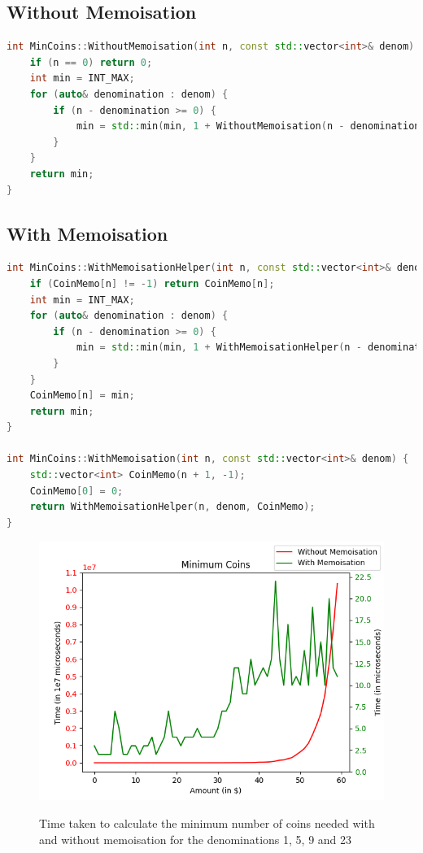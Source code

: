 \documentclass[12pt, a4paper]{article}
\theoremstyle{definition}
\theoremstyle{remark}
\begin{document}
\subsection{Without Memoisation}
\begin{lstlisting}[language=C++]
int MinCoins::WithoutMemoisation(int n, const std::vector<int>& denom) {
    if (n == 0) return 0;
    int min = INT_MAX;
    for (auto& denomination : denom) {
        if (n - denomination >= 0) {
            min = std::min(min, 1 + WithoutMemoisation(n - denomination, denom));
        }
    }
    return min;
}
\end{lstlisting}

\subsection{With Memoisation}

\begin{lstlisting}[language=C++]
int MinCoins::WithMemoisationHelper(int n, const std::vector<int>& denom, std::vector<int>& CoinMemo) {
    if (CoinMemo[n] != -1) return CoinMemo[n];
    int min = INT_MAX;
    for (auto& denomination : denom) {
        if (n - denomination >= 0) {
            min = std::min(min, 1 + WithMemoisationHelper(n - denomination, denom, CoinMemo));
        }
    }
    CoinMemo[n] = min;
    return min;
}

int MinCoins::WithMemoisation(int n, const std::vector<int>& denom) {
    std::vector<int> CoinMemo(n + 1, -1);
    CoinMemo[0] = 0;
    return WithMemoisationHelper(n, denom, CoinMemo);
}
\end{lstlisting}

\begin{figure}[!h]
    \centering
    \includegraphics[scale=0.95]{img/Minimum Coins - Memo vs No Memo Graph.png}
    \label{fig:mincoins}
    \caption{Time taken to calculate the minimum number of coins needed with and without memoisation for the denominations 1, 5, 9 and 23}
\end{figure}
\end{document}
